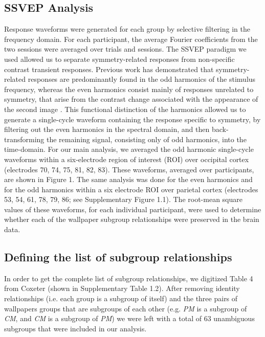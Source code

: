 \documentclass[11pt, twoside]{article}
\begin{document}
\subsection*{SSVEP Analysis}
Response waveforms were generated for each group by selective filtering in the frequency domain. For each participant, the average Fourier coefficients from the two sessions were averaged over trials and sessions. The SSVEP paradigm we used allowed us to separate symmetry-related responses from non-specific contrast transient responses. Previous work has demonstrated that symmetry-related responses are predominantly found in the odd harmonics of the stimulus frequency, whereas the even harmonics consist mainly of responses unrelated to symmetry, that arise from the contrast change associated with the appearance of the second image \cite{RN1954, RN1725}. This functional distinction of the harmonics allowed us to generate a single-cycle waveform containing the response specific to symmetry, by filtering out the even harmonics in the spectral domain, and then back-transforming the remaining signal, consisting only of odd harmonics, into the time-domain. For our main analysis, we averaged the odd harmonic single-cycle waveforms within a six-electrode region of interest (ROI) over occipital cortex (electrodes 70, 74, 75, 81, 82, 83). These waveforms, averaged over participants, are shown in Figure 1. The same analysis was done for the even harmonics and for the odd harmonics within a six electrode ROI over parietal cortex (electrodes 53, 54, 61, 78, 79, 86; see Supplementary Figure 1.1). The root-mean square values of these waveforms, for each individual participant, were used to determine whether each of the wallpaper subgroup relationships were preserved in the brain data.  

\subsection*{Defining the list of subgroup relationships}
In order to get the complete list of subgroup relationships, we digitized Table 4 from Coxeter \cite{RN1711} (shown in Supplementary Table 1.2). After removing identity relationships (i.e. each group is a subgroup of itself) and the three pairs of wallpapers groups that are subgroups of each other (e.g. \textit{PM} is a subgroup of \textit{CM}, and \textit{CM} is a subgroup of \textit{PM}) we were left with a total of 63 unambiguous subgroups that were included in our analysis. 
\end{document}
